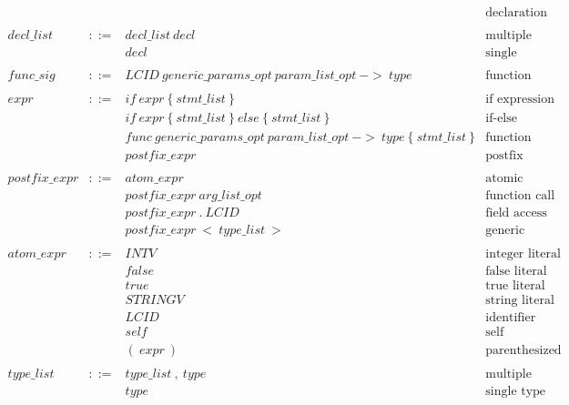 $$\begin{array}{llll}
                &     &                    & \text{declaration only} \\
\\
decl\_list & ::= & decl\_list\ decl & \text{multiple declarations} \\
           &     & decl             & \text{single declaration}    \\
\\
func\_sig & ::= & LCID\ generic\_params\_opt\ param\_list\_opt\ ->\ type & \text{function signature} \\
\\
expr & ::= & if\ expr\ \{\ stmt\_list\ \} & \text{if expression} \\
     &     & if\ expr\ \{\ stmt\_list\ \}\ else\ \{\ stmt\_list\ \} & \text{if-else expression} \\
     &     & func\ generic\_params\_opt\ param\_list\_opt\ ->\ type\ \{\ stmt\_list\ \} & \text{function expression} \\
     &     & postfix\_expr & \text{postfix expression} \\
\\
postfix\_expr & ::= & atom\_expr & \text{atomic expression} \\
              &     & postfix\_expr\ arg\_list\_opt & \text{function call} \\
              &     & postfix\_expr\ .\ LCID & \text{field access} \\
              &     & postfix\_expr\ <\ type\_list\ > & \text{generic instantiation} \\
\\
atom\_expr & ::= & INTV       & \text{integer literal}            \\
           &     & false      & \text{false literal}              \\
           &     & true       & \text{true literal}               \\
           &     & STRINGV    & \text{string literal}             \\
           &     & LCID       & \text{identifier}                 \\
           &     & self       & \text{self expression}            \\
           &     & (\ expr\ ) & \text{parenthesized expression}   \\
\\
type\_list & ::= & type\_list\ ,\ type & \text{multiple types} \\
           &     & type                & \text{single type}    \\

\end{array}$$
